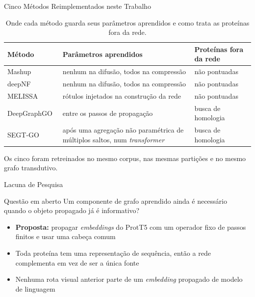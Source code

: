 \documentclass[aspectratio=169,11pt]{beamer}
\begin{document}
\begin{frame}{Cinco Métodos Reimplementados neste Trabalho}
  \begin{table}\footnotesize
    \caption{Onde cada método guarda seus parâmetros aprendidos e como trata as proteínas fora da rede.}
    \begin{tabular}{@{}lp{6.6cm}l@{}}\toprule
      Método & Parâmetros aprendidos & Proteínas fora da rede \\ \midrule
      Mashup~\cite{cho2016compact} & nenhum na difusão, todos na compressão & não pontuadas \\
      deepNF~\cite{deepnf} & nenhum na difusão, todos na compressão & não pontuadas \\
      MELISSA~\cite{wu2024melissa} & rótulos injetados na construção da rede & não pontuadas \\
      DeepGraphGO~\cite{you_deepgraphgo_2021} & entre os passos de propagação & busca de homologia \\
      SEGT-GO~\cite{wang2025segtgo} & após uma agregação não paramétrica de múltiplos saltos, num \textit{transformer} & busca de homologia \\
      \bottomrule
    \end{tabular}
  \end{table}
  \vspace{0.2em}
  Os cinco foram retreinados no mesmo corpus, nas mesmas partições e no mesmo grafo transdutivo.
\end{frame}

\begin{frame}{Lacuna de Pesquisa}
  \begin{alertblock}{Questão em aberto}
    \centering Um componente de grafo aprendido ainda é necessário quando o objeto propagado já é informativo?
  \end{alertblock}
  \vspace{0.5em}
  \begin{itemize}\setlength{\itemsep}{0.45em}
    \item \textbf{Proposta:} propagar \textit{embeddings} do ProtT5 com um operador fixo de passos finitos e usar uma cabeça comum
    \item Toda proteína tem uma representação de sequência, então a rede complementa em vez de ser a única fonte
    \item Nenhuma rota visual anterior parte de um \textit{embedding} propagado de modelo de linguagem
  \end{itemize}
\end{frame}
\end{document}
